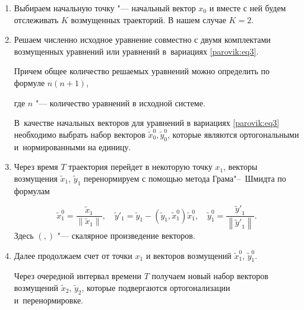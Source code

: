 \begin{enumerate}

\item[1.] Выбираем начальную точку "--- начальный вектор ${x_0}$ и вместе с ней будем отслеживать $K$ возмущенных траекторий. В нашем случае ${K = 2}$.



\hypertarget{par:p2}{}



\item[2.] Решаем численно исходное уравнение совместно с двумя комплектами возмущенных уравнений или уравнений в~вариациях \eqref{parovik:eq3}. 

Причем общее количество решаемых уравнений можно определить по формуле $n( n + 1)$, 

где $n$ "--- количество уравнений в исходной системе.   

В~качестве начальных векторов для уравнений в вариациях \eqref{parovik:eq3} необходимо выбрать набор векторов $\tilde x_0^0,\tilde y_0^0$, которые являются ортогональными и~нормированными на единицу.



\hypertarget{par:p3}{}

\item[3.] Через время $T$ траектория перейдет в некоторую точку ${x_1}$, векторы возмущения ${\tilde x_1}$, ${\tilde y_1}$ перенормируем с помощью метода Грама"--~Шмидта по формулам 

$$

\tilde x_1^0 = \frac{{{{\tilde x}_1}}}{{\left\|{{{\tilde x}_1}} \right\|}},\quad 

{\tilde y'_1} = {\tilde y_1} - \left( {{{\tilde y}_1},\tilde x_1^0} \right)\tilde x_1^0,\quad 

\tilde y_1^0 = \frac{{{{\tilde y'}_1}}}{{\left\| {{{\tilde y'}_1}} \right\|}}.$$ Здесь $({},{})$ "--- скалярное произведение векторов.



\hypertarget{par:p4}{}



\item[4.] Далее продолжаем счет от точки ${x_1}$ и векторов возмущений $\tilde

x_1^0$, $\tilde y_1^0$. 

Через очередной интервал времени $T$ получаем новый набор векторов возмущений ${\tilde x_2}$, ${\tilde y_2}$, которые подвергаются ортогонализации и~перенормировке.




\end{enumerate}
